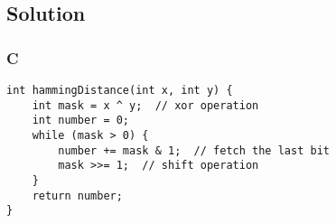 \subsection*{Solution}
\subsubsection*{C}
\begin{verbatim}
int hammingDistance(int x, int y) {
    int mask = x ^ y;  // xor operation
    int number = 0;
    while (mask > 0) {
        number += mask & 1;  // fetch the last bit
        mask >>= 1;  // shift operation
    }
    return number;
}
\end{verbatim}

\newpage

